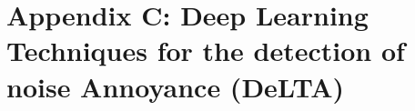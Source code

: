 \chapter{Appendix C: Deep Learning Techniques for the detection of noise Annoyance (DeLTA)}
\label{app:delta}